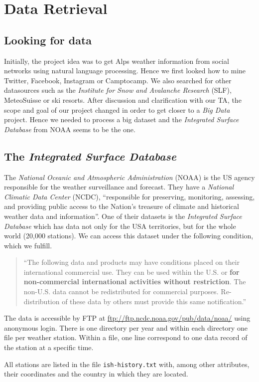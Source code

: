 \section{Data Retrieval}
\subsection{Looking for data}
Initially, the project idea was to get Alps weather information from social networks using natural language processing. Hence we first looked how to mine Twitter, Facebook, Instagram or Camptocamp. We also searched for other datasources such as the \emph{Institute for Snow and Avalanche Research} (SLF), MeteoSuisse or ski resorts. After discussion and clarification with our TA, the scope and goal of our project changed in order to get closer to a \emph{Big Data} project. Hence we needed to process a big dataset and the \emph{Integrated Surface Database} from NOAA seems to be the one.

\subsection{The \emph{Integrated Surface Database}}
The \emph{National Oceanic and Atmospheric Administration} (NOAA) is the US agency responsible for the weather surveillance and forecast. They have a \emph{National Climatic Data Center} (NCDC), “responsible for preserving, monitoring, assessing, and providing public access to the Nation's treasure of climate and historical weather data and information”. One of their datasets is the \emph{Integrated Surface Database} which has data not only for the USA territories, but for the whole world (20,000 stations). We can access this dataset under the following condition, which we fulfill.
\begin{quote}
“The following data and products may have conditions placed on their international commercial use. They can be used within the U.S. or \textbf{for non-commercial international activities without restriction}. The non-U.S. data cannot be redistributed for commercial purposes. Re-distribution of these data by others must provide this same notification.”
\end{quote}
The data is accessible by FTP at \url{ftp://ftp.ncdc.noaa.gov/pub/data/noaa/} using anonymous login. There is one directory per year and within each directory one file per weather station. Within a file, one line correspond to one data record of the station at a specific time.

All stations are listed in the file \texttt{ish-history.txt} with, among other attributes, their coordinates and the country in which they are located.

